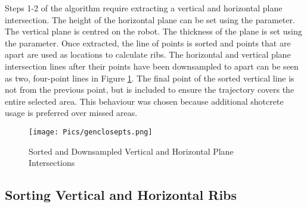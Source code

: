 Steps 1-2 of the algorithm require extracting a vertical and horizontal plane intersection. The height of the horizontal plane can be set using the  parameter. The vertical plane is centred on the robot. The thickness of the plane is set using the  parameter. Once extracted, the line of points is sorted and points that are  apart are used as locations to calculate ribs. The horizontal and vertical plane intersection lines after their points have been downsampled to  apart can be seen as two, four-point lines in Figure \ref{fig:sortedintersections}. The final point of the sorted vertical line is not  from the previous point, but is included to ensure the trajectory covers the entire selected area. This behaviour was chosen because additional shotcrete usage is preferred over missed areas.\\
\begin{figure}[H]
    \centering
    \texttt{[image: Pics/genclosepts.png]}
    \caption{Sorted and Downsampled Vertical and Horizontal Plane Intersections}
    \label{fig:sortedintersections}
\end{figure}

\subsection{Sorting Vertical and Horizontal Ribs}
\label{sec:sortlines}

